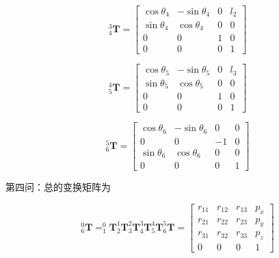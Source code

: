 \documentclass{homework}
\begin{document}
\begin{sol}
\[
  _4^3\mathbf{T} =
  \begin{bmatrix}
    \cos\theta_4 & -\sin\theta_4 & 0 & l_2 \\
    \sin\theta_4 & \cos\theta_4 & 0 & 0 \\
    0 & 0 & 1 & 0 \\
    0 & 0 & 0 & 1
  \end{bmatrix}
\]

\[
  _5^4\mathbf{T} =
  \begin{bmatrix}
    \cos\theta_5 & -\sin\theta_5 & 0 & l_3 \\
    \sin\theta_5 & \cos\theta_5 & 0 & 0 \\
    0 & 0 & 1 & 0 \\
    0 & 0 & 0 & 1
  \end{bmatrix}
\]

\[
  _6^5\mathbf{T} =
  \begin{bmatrix}
    \cos\theta_6 & -\sin\theta_6 & 0 & 0 \\
    0 & 0 & -1 & 0 \\
    \sin\theta_6 & \cos\theta_6 & 0 & 0 \\
    0 & 0 & 0 & 1
  \end{bmatrix}
\]

第四问：总的变换矩阵为

\[
  _6^0\mathbf{T} = _1^0\mathbf{T} _2^1\mathbf{T} _3^2\mathbf{T} _4^3\mathbf{T} _5^4\mathbf{T} _6^5\mathbf{T} =
  \begin{bmatrix} 
r_{11} & r_{12} & r_{13} & p_x \\ 
r_{21} & r_{22} & r_{23} & p_y \\ 
r_{31} & r_{32} & r_{33} & p_z \\ 
0 & 0 & 0 & 1
\end{bmatrix}
\] 


\end{sol}
\end{document}
